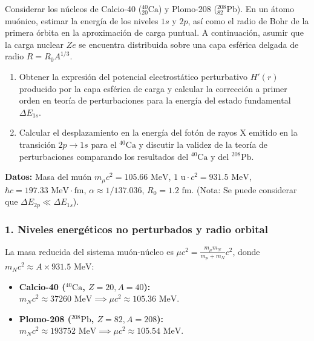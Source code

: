 \begin{problema}
Considerar los núcleos de Calcio-40 (${}_{20}^{40}\text{Ca}$) y Plomo-208 (${}_{82}^{208}\text{Pb}$). En un átomo muónico, estimar la energía de los niveles $1s$ y $2p$, así como el radio de Bohr de la primera órbita en la aproximación de carga puntual. A continuación, asumir que la carga nuclear $Ze$ se encuentra distribuida sobre una capa esférica delgada de radio $R = R_0 A^{1/3}$.

\begin{enumerate}[label=\alph*)]
    \item Obtener la expresión del potencial electrostático perturbativo $H'(r)$ producido por la capa esférica de carga y calcular la corrección a primer orden en teoría de perturbaciones para la energía del estado fundamental $\Delta E_{1s}$.
    \item Calcular el desplazamiento en la energía del fotón de rayos X emitido en la transición $2p \to 1s$ para el ${}^{40}\text{Ca}$ y discutir la validez de la teoría de perturbaciones comparando los resultados del ${}^{40}\text{Ca}$ y del ${}^{208}\text{Pb}$.
\end{enumerate}

\textbf{Datos:} Masa del muón $m_\mu c^2 = 105.66\text{ MeV}$, $1\text{ u} \cdot c^2 = 931.5\text{ MeV}$, $\hbar c = 197.33\text{ MeV}\cdot\text{fm}$, $\alpha \approx 1/137.036$, $R_0 = 1.2\text{ fm}$. (Nota: Se puede considerar que $\Delta E_{2p} \ll \Delta E_{1s}$).

\tcblower

\subsubsection*{1. Niveles energéticos no perturbados y radio orbital}

La masa reducida del sistema muón-núcleo es $\mu c^2 = \frac{m_\mu m_N}{m_\mu + m_N} c^2$, donde $m_N c^2 \approx A \times 931.5\text{ MeV}$:
\begin{itemize}
    \item \textbf{Calcio-40 (${}^{40}\text{Ca}$, $Z=20, A=40$):} $m_N c^2 \approx 37260\text{ MeV} \implies \mu c^2 \approx 105.36\text{ MeV}$.
    \item \textbf{Plomo-208 (${}^{208}\text{Pb}$, $Z=82, A=208$):} $m_N c^2 \approx 193752\text{ MeV} \implies \mu c^2 \approx 105.54\text{ MeV}$.
\end{itemize}


\end{problema}
